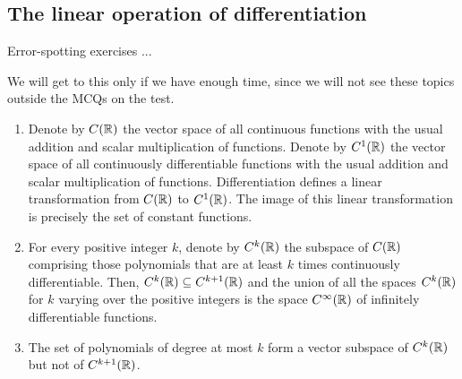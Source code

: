 \documentclass[10pt]{amsart}
\begin{document}
\subsection{The linear operation of differentiation}

Error-spotting exercises ...

We will get to this only if we have enough time, since we will not see
these topics outside the MCQs on the test.
\begin{enumerate}
\item Denote by $C(\mathbb{R})$ the vector space of all continuous functions
  with the usual addition and scalar multiplication of
  functions. Denote by $C^1(\mathbb{R})$ the vector space of all continuously
  differentiable functions with the usual addition and scalar
  multiplication of functions. Differentiation defines a linear
  transformation from $C(\mathbb{R})$ to $C^1(\mathbb{R})$. The image of this linear
  transformation is precisely the set of constant functions.
\item For every positive integer $k$, denote by $C^k(\mathbb{R})$ the subspace
  of $C(\mathbb{R})$ comprising those polynomials that are at least $k$ times
  continuously differentiable. Then, $C^k(\mathbb{R}) \subseteq C^{k+1}(\mathbb{R})$
  and the union of all the spaces $C^k(\mathbb{R})$ for $k$ varying over the
  positive integers is the space $C^\infty(\mathbb{R})$ of infinitely
  differentiable functions.
\item The set of polynomials of degree at most $k$ form a vector
  subspace of $C^k(\mathbb{R})$ but not of $C^{k+1}(\mathbb{R})$. 
\end{enumerate}
\end{document}
